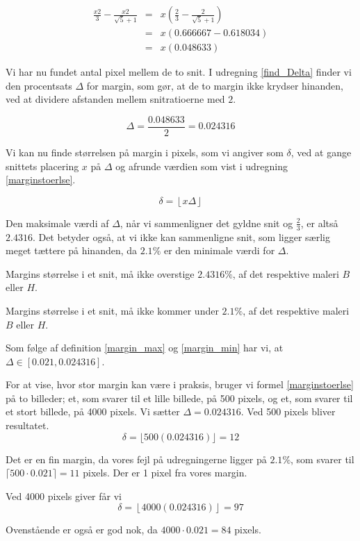 {\begin{eqnarray}
	\frac{x2}{3} - \frac{x2}{\sqrt{5}+1} & = & x(\frac{2}{3} - \frac{2}{\sqrt{5} + 1}) \nonumber \\
	& = & x(0.666667-0.618034) \\ \nonumber
	& = & x(0.048633)
    \label{diff_snit}
\end{eqnarray}

Vi har nu fundet antal pixel mellem de to snit. I udregning
\ref{find_Delta} finder vi den procentsats $\Delta$ for margin, som gør,
at de to margin ikke krydser hinanden, ved at dividere afstanden mellem
snitratioerne med $2$.

\begin{equation}
    \Delta = \frac{0.048633}{2} = 0.024316
    \label{find_Delta}
\end{equation}

Vi kan nu finde størrelsen på margin i pixels, som vi angiver som
$\delta$, ved at gange snittets placering $x$ på $\Delta$ og afrunde
værdien som vist i udregning \ref{marginstoerlse}.

\begin{equation}
	\delta = \left\lfloor x\Delta \right\rfloor
    \label{marginstoerlse}
\end{equation}

Den maksimale værdi af $\Delta$, når vi sammenligner det gyldne snit og
$\frac{2}{3}$, er altså $2.4316$. Det betyder også, at vi ikke kan
sammenligne snit, som ligger særlig meget tættere på hinanden, da
$2.1\%$ er den minimale værdi for $\Delta$.

\begin{definition}
    Margins størrelse i et snit, må ikke overstige $2.4316 \%$, af det
    respektive maleri $B$ eller $H$.
	\label{margin_max}
\end{definition}

\begin{definition}
	Margins størrelse i et snit, må ikke kommer under $2.1 \%$, af det
    respektive maleri $B$ eller $H$.
	\label{margin_min}
\end{definition}

Som følge af definition \ref{margin_max} og \ref{margin_min} har vi, at
$\Delta \in [0.021, 0.024316]$.

For at vise, hvor stor margin kan være i praksis, bruger vi formel
\ref{marginstoerlse} på to billeder; et, som svarer til et lille
billede, på 500 pixels, og et, som svarer til et stort billede, på 4000
pixels.  Vi sætter $\Delta = 0.024316$.  Ved 500 pixels bliver
resultatet.
\begin{equation}
	 \delta = \lfloor 500(0.024316)\rfloor = 12
\end{equation}

Det er en fin margin, da vores fejl på udregningerne ligger på $2.1\%$,
som svarer til $\lceil 500 \cdot 0.021 \rceil = 11$ pixels. Der er 1 pixel fra
vores margin.

Ved 4000 pixels giver får vi
\begin{equation}
	 \delta = \left\lfloor 4000(0.024316)\right\rfloor = 97
\end{equation}

Ovenstående er også er god nok, da $4000 \cdot 0.021 = 84$ pixels.

\clearpage
}
